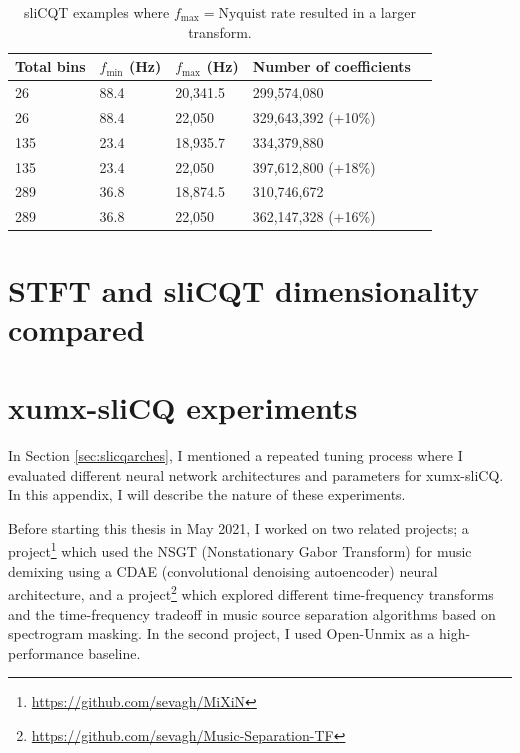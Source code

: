 \documentclass[report.tex]{subfiles}
\begin{document}
\begin{appendices}
\begin{table}[ht]
	\centering
	\caption{sliCQT examples where $f_{\text{max}} = \text{Nyquist rate}$ resulted in a larger transform.}
	\label{table:slicqdimdegen2}
\begin{tabular}{ |l|l|l|l|l| }
	 \hline
	 Total bins & $f_{\text{min}}$ (Hz) & $f_{\text{max}}$ (Hz) & Number of coefficients \\
	 \hline
	 26 & 88.4 & 20,341.5 & 299,574,080 \\
	 \hline
	 26 & 88.4 & 22,050 & 329,643,392 (+10\%) \\
	 \hline
	 \hline
	 135 & 23.4 & 18,935.7 & 334,379,880 \\
	 \hline
	 135 & 23.4 & 22,050 & 397,612,800 (+18\%) \\
	 \hline
	 \hline
	 289 & 36.8 & 18,874.5 & 310,746,672 \\
	 \hline
	 289 & 36.8 & 22,050 & 362,147,328 (+16\%) \\
	 \hline
\end{tabular}
\end{table}

\newpagefill

\section{STFT and sliCQT dimensionality compared}
\label{appendix:slicqdim2}

\newpagefill

\section{xumx-sliCQ experiments}
\label{appendix:crazyexperiments}

In Section \ref{sec:slicqarches}, I mentioned a repeated tuning process where I evaluated different neural network architectures and parameters for xumx-sliCQ. In this appendix, I will describe the nature of these experiments.

Before starting this thesis in May 2021, I worked on two related projects; a project\footnote{\url{https://github.com/sevagh/MiXiN}} which used the NSGT (Nonstationary Gabor Transform) for music demixing using a CDAE (convolutional denoising autoencoder) neural architecture, and a project\footnote{\url{https://github.com/sevagh/Music-Separation-TF}} which explored different time-frequency transforms and the time-frequency tradeoff in music source separation algorithms based on spectrogram masking. In the second project, I used Open-Unmix as a high-performance baseline.


\end{appendices}
\end{document}
